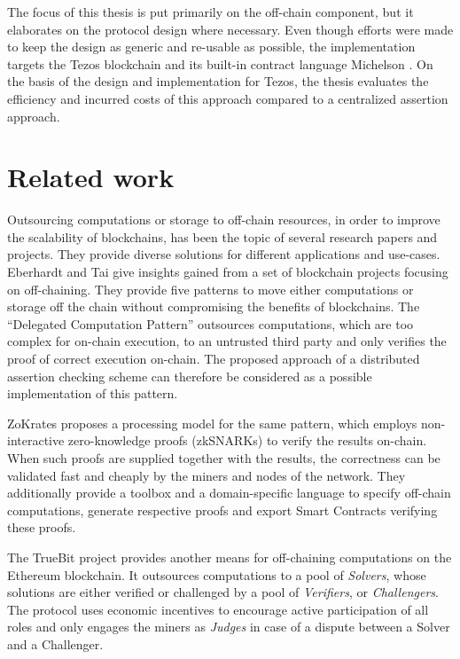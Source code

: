 The focus of this thesis is put primarily on the off-chain component, but it elaborates on the protocol design where necessary.  Even though efforts were made to keep the design as generic and re-usable as possible, the implementation targets the Tezos \cite{goodman_tezos_2014} blockchain and its built-in contract language Michelson \cite{michelson_ref}. On the basis of the design and implementation for Tezos, the thesis evaluates the efficiency and incurred costs of this approach compared to a centralized assertion approach.

\section{Related work}
Outsourcing computations or storage to off-chain resources, in order to improve the scalability of blockchains, has been the topic of several research papers and projects. They provide diverse solutions for different applications and use-cases. Eberhardt and Tai \cite{eberhardt_offonchain} give insights gained from a set of blockchain projects focusing on off-chaining. They provide five patterns to move either computations or storage off the chain without compromising the benefits of blockchains. The ``Delegated Computation Pattern'' outsources computations, which are too complex for on-chain execution, to an untrusted third party and only verifies the proof of correct execution on-chain. The proposed approach of a distributed assertion checking scheme can therefore be considered as a possible implementation of this pattern.

ZoKrates \cite{eberhardt_zokrates_2018} proposes a processing model for the same pattern, which employs non-interactive zero-knowledge proofs (zkSNARKs) to verify the results on-chain. When such proofs are supplied together with the results, the correctness can be validated fast and cheaply by the miners and nodes of the network. They additionally provide a toolbox and a domain-specific language to specify off-chain computations, generate respective proofs and export Smart Contracts verifying these proofs.

The TrueBit \cite{teutsch_truebit} project provides another means for off-chaining computations on the Ethereum blockchain. It outsources computations to a pool of \textit{Solvers}, whose solutions are either verified or challenged by a pool of \textit{Verifiers}, or \textit{Challengers}. The protocol uses economic incentives to encourage active participation of all roles and only engages the miners as \textit{Judges} in case of a dispute between a Solver and a Challenger. 


